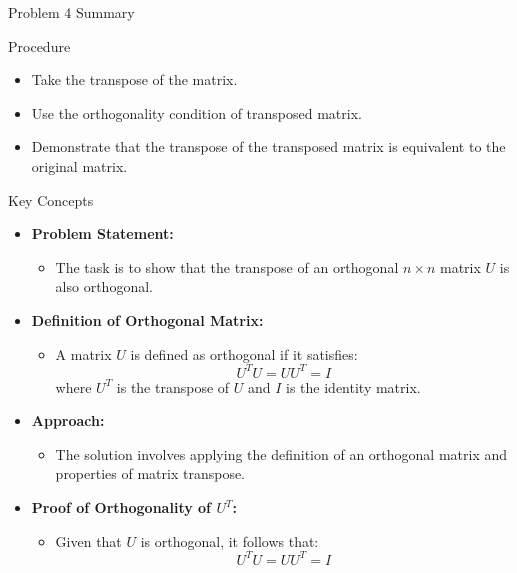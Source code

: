 \begin{summary}{Problem 4 Summary}
    \begin{statement}{Procedure}
        \begin{itemize}
            \item Take the transpose of the matrix.
            \item Use the orthogonality condition of transposed matrix.
            \item Demonstrate that the transpose of the transposed matrix is equivalent to the original matrix.
        \end{itemize}
    \end{statement}
    \begin{statement}{Key Concepts}
        \begin{itemize}
            \item \textbf{Problem Statement:}
            \begin{itemize}
                \item The task is to show that the transpose of an orthogonal $n \times n$ matrix $U$ is also orthogonal.
            \end{itemize}
            \item \textbf{Definition of Orthogonal Matrix:}
            \begin{itemize}
                \item A matrix $U$ is defined as orthogonal if it satisfies:
                \begin{equation*}
                    U^T U = UU^T = I
                \end{equation*}
                where $U^T$ is the transpose of $U$ and $I$ is the identity matrix.
            \end{itemize}
            \item \textbf{Approach:}
            \begin{itemize}
                \item The solution involves applying the definition of an orthogonal matrix and properties of matrix transpose.
            \end{itemize}
            \item \textbf{Proof of Orthogonality of $U^T$:}
            \begin{itemize}
                \item Given that $U$ is orthogonal, it follows that:
                \begin{equation*}
                    U^T U = UU^T = I

\end{equation*}
\end{itemize}
\end{itemize}
\end{statement}
\end{summary}
